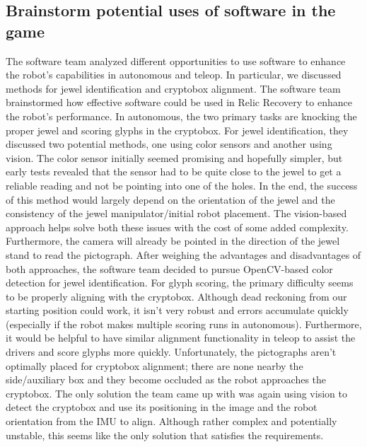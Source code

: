 \documentclass{article}
\begin{document}
\subsection{Brainstorm potential uses of software in the game}
The software team analyzed different opportunities to use software to enhance the robot's capabilities in autonomous and teleop. In particular, we discussed methods for jewel identification and cryptobox alignment.	The software team brainstormed how effective software could be used in Relic Recovery to enhance the robot's performance. In autonomous, the two primary tasks are knocking the proper jewel and scoring glyphs in the cryptobox. For jewel identification, they discussed two potential methods, one using color sensors and another using vision. The color sensor initially seemed promising and hopefully simpler, but early tests revealed that the sensor had to be quite close to the jewel to get a reliable reading and not be pointing into one of the holes. In the end, the success of this method would largely depend on the orientation of the jewel and the consistency of the jewel manipulator/initial robot placement. The vision-based approach helps solve both these issues with the cost of some added complexity. Furthermore, the camera will already be pointed in the direction of the jewel stand to read the pictograph. After weighing the advantages and disadvantages of both approaches, the software team decided to pursue OpenCV-based color detection for jewel identification. For glyph scoring, the primary difficulty seems to be properly aligning with the cryptobox. Although dead reckoning from our starting position could work, it isn't very robust and errors accumulate quickly (especially if the robot makes multiple scoring runs in autonomous). Furthermore, it would be helpful to have similar alignment functionality in teleop to assist the drivers and score glyphs more quickly. Unfortunately, the pictographs aren't optimally placed for cryptobox alignment; there are none nearby the side/auxiliary box and they become occluded as the robot approaches the cryptobox. The only solution the team came up with was again using vision to detect the cryptobox and use its positioning in the image and the robot orientation from the IMU to align. Although rather complex and potentially unstable, this seems like the only solution that satisfies the requirements.
\end{document}
